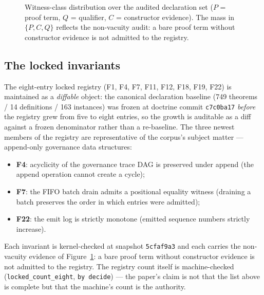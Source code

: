 ﻿\documentclass[11pt]{article}
\begin{document}
\begin{figure}[htbp]
\centering
{}
\caption{Witness-class distribution over the audited declaration set ($P$ = proof term, $Q$ = qualifier, $C$ = constructor evidence). The mass in $\{P,C,Q\}$ reflects the non-vacuity audit: a bare proof term without constructor evidence is not admitted to the registry.}
\label{fig:verdict}
\end{figure}

\subsection{The locked invariants}
The eight-entry locked registry (F1, F4, F7, F11, F12, F18, F19, F22) is maintained as a \emph{diffable} object: the canonical declaration baseline (749 theorems / 14 definitions / 163 instances) was frozen at doctrine commit \texttt{c7c0ba17} \emph{before} the registry grew from five to eight entries, so the growth is auditable as a diff against a frozen denominator rather than a re-baseline. The three newest members of the registry are representative of the corpus's subject matter --- append-only governance data structures:
\begin{itemize}
\item \textbf{F4}: acyclicity of the governance trace DAG is preserved under append (the append operation cannot create a cycle);
\item \textbf{F7}: the FIFO batch drain admits a positional equality witness (draining a batch preserves the order in which entries were admitted);
\item \textbf{F22}: the emit log is strictly monotone (emitted sequence numbers strictly increase).
\end{itemize}
Each invariant is kernel-checked at snapshot \texttt{5cfaf9a3} and each carries the non-vacuity evidence of Figure~\ref{fig:verdict}: a bare proof term without constructor evidence is not admitted to the registry. The registry count itself is machine-checked (\texttt{locked\_count\_eight}, \texttt{by decide}) --- the paper's claim is not that the list above is complete but that the machine's count is the authority.
\end{document}
